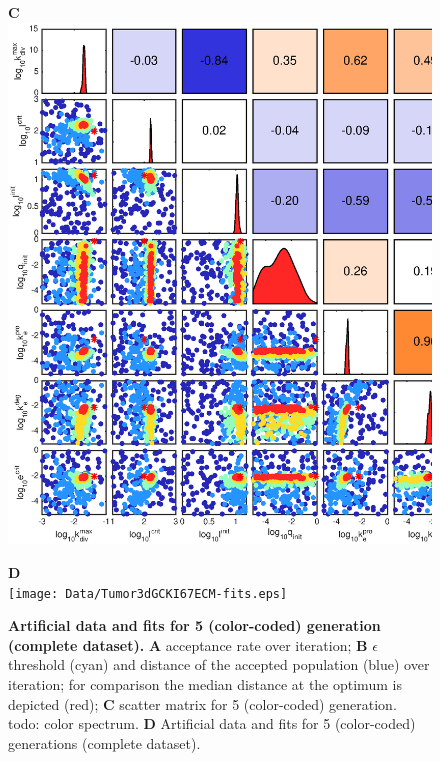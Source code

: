 \documentclass[10pt,letterpaper]{article}
\begin{document}
\begin{figure}[htbp]
\begin{minipage}[t]{0.33\textwidth}
\end{minipage}
\begin{minipage}[t]{0.66\textwidth}
\textbf{C}\\
\includegraphics[width=\textwidth]{Data/Tumor3dGCKI67ECM-scatterPlotMatrix.eps}
\end{minipage}
\textbf{D}\\
\texttt{[image: Data/Tumor3dGCKI67ECM-fits.eps]}
\caption{{\bf Artificial data and fits for 5 (color-coded) generation (complete dataset).}
\textbf{A}  acceptance rate over iteration; \textbf{B} $\epsilon$ threshold (cyan) and distance of the accepted population (blue) over iteration; for comparison the median distance at the optimum is depicted (red); \textbf{C} scatter matrix for 5 (color-coded) generation. todo: color spectrum. \textbf{D} Artificial data and fits for 5 (color-coded) generations (complete dataset).}
\label{fig:exp3d}
\end{figure}
\end{document}
